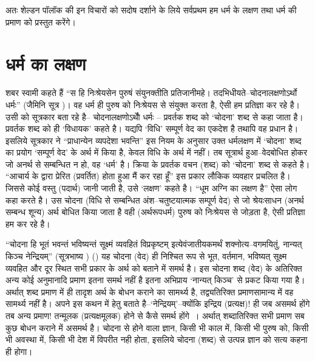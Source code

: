 अतः शेल्डन पॉलॉक की इन विचारों को सदोष दर्शाने के लिये सर्वप्रथम हम धर्म के लक्षण तथा धर्म की प्रमाण को प्रस्तुत करेंगे।


\section*{धर्म का लक्षण}

शबर स्वामी कहते हैं “स हि निःश्रेयसेन पुरुषं संयुनक्तीति प्रतिजानीमहे। तदभिधीयते–चोदनालक्षणोऽर्थो धर्मः” (जैमिनि सूत्र )। वह धर्म ही पुरुष को निःश्रेयस से संयुक्त करता है, ऐसी हम प्रतिज्ञा कर रहे है। उसी को सूत्रकार बता रहे है– चोदनालक्षणोऽर्थोे धर्मः – प्रवर्तक शब्द को ‘चोदना' शब्द से कहा जाता है। प्रवर्तक शब्द को ही ‘विधायक' कहते है। यद्यपि ‘विधि' सम्पूर्ण वेद का एकदेश है तथापि वह प्रधान है। इसलिये सूत्रकार ने “प्राधान्येन व्यपदेशा भवन्ति” इस नियम के अनुसार उक्त धर्मलक्षण में ‘चोदना' शब्द का प्रयोग ‘सम्पूर्ण वेद' के अर्थ में किया है, केवल विधि के अर्थ में नहीं। तब सूत्रार्थ हुआ–वेदबोधित होकर जो अनर्थ से सम्बन्धित न हो, वह ‘धर्म' है। क्रिया के प्रवर्तक वचन (शब्द) को ‘चोदना' शब्द से कहते है। “आचार्य के द्वारा प्रेरित (प्रवर्तित) होता हुआ मैं कर रहा हूँ” इस प्रकार लौकिक व्यवहार प्रचलित है। जिससे कोई वस्तु (पदार्थ) जानी जाती है, उसे ‘लक्षण' कहते है। “धूम अग्नि का लक्षण है” ऐसा लोग कहा करते है। उस चोदना (विधि से सम्बन्धित अंश–चतुष्टयात्मक सम्पूर्ण वेद) से जो श्रेयःसाधन (अनर्थ सम्बन्ध शून्य) अर्थ बोधित किया जाता है वही (अर्थरूपधर्म) पुरुष को निःश्रेयस से जोड़ता है, ऐसी प्रतिज्ञा हम कर रहे है।

“चोदना हि भूतं भवन्तं भविष्यन्तं सूक्ष्मं व्यवहितं विप्रकृष्टम् इत्येवंजातीयकमर्थं शक्नोत्य–वगमयितुं, नान्यत् किञ्च नेन्द्रियम्” (सूत्रभाष्य ) () यह चोदना (वेद) ही निश्चित रूप से भूत, वर्तमान, भविष्यत् सूक्ष्म व्यवहित और दूर स्थित सभी प्रकार के अर्थ को बताने में समर्थ है। इस चोदना शब्द (वेद) के अतिरिक्त अन्य कोई अनुमानादि प्रमाण इतना समर्थ नहीं है इतना अभिप्राय ‘नान्यत् किञ्च' से प्रकट किया गया है। अर्थात् शब्द प्रमाण में ही तादृश अर्थ के बोधन कराने का सामर्थ्य है, तद्व्यतिरिक्त प्रमाणसामान्य में वह सामर्थ्य नहीं है। अपने इस कथन में हेतु बताते है–‘नेन्द्रियम्'–क्योंकि इन्द्रिय (प्रत्यक्ष)! ही जब असमर्थ होंगे तब अन्य प्रमाण! तन्मूलक (प्रत्यक्षमूलक) होने से कैसे समर्थ होंगे~। अर्थात् शब्दातिरिक्त सभी प्रमाण सब कुछ बोधन कराने में असमर्थ है। चोदना से होने वाला ज्ञान, किसी भी काल में, किसी भी पुरुष को, किसी भी अवस्था में, किसी भी देश में विपरीत नही होता, इसलिये चोदना (शब्द) से उत्पन्न ज्ञान को सत्य कहना ही होगा।


